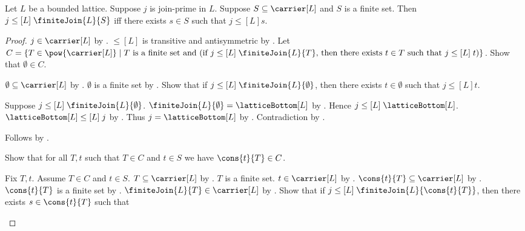\begin{theorem}\label{join_prime_below_finite_join_iff}
    Let $L$ be a bounded lattice.
    Suppose $j$ is join-prime in $L$.
    Suppose $S\subseteq\carrier[L]$ and $S$ is a finite set.
    Then $j\mathrel{\leq[L]}\finiteJoin{L}{S}$ iff
        there exists $s\in S$ such that $j\mathrel{\leq[L]}s$.
\end{theorem}
\begin{proof}
    $j\in\carrier[L]$ by .
    $\leq[L]$ is transitive and antisymmetric by
        .
    Let $C=\{T\in\pow{\carrier[L]}\mid
        \text{$T$ is a finite set and (if
            $j\mathrel{\leq[L]}\finiteJoin{L}{T}$, then
            there exists $t\in T$ such that $j\mathrel{\leq[L]}t$)}\}$.
    Show that $\emptyset\in C$.
    \begin{subproof}
        $\emptyset\subseteq\carrier[L]$ by .
        $\emptyset$ is a finite set by .
        Show that if $j\mathrel{\leq[L]}\finiteJoin{L}{\emptyset}$, then
            there exists $t\in\emptyset$ such that
                $j\mathrel{\leq[L]}t$.
        \begin{subproof}
            Suppose $j\mathrel{\leq[L]}\finiteJoin{L}{\emptyset}$.
            $\finiteJoin{L}{\emptyset}=\latticeBottom[L]$ by
                .
            Hence $j\mathrel{\leq[L]}\latticeBottom[L]$.
            $\latticeBottom[L]\mathrel{\leq[L]}j$ by
                .
            Thus $j=\latticeBottom[L]$ by .
            Contradiction by .
        \end{subproof}
        Follows by .
    \end{subproof}
    Show that for all $T,t$ such that $T\in C$ and $t\in S$ we have
        $\cons{t}{T}\in C$.
    \begin{subproof}
        Fix $T,t$.
        Assume $T\in C$ and $t\in S$.
        $T\subseteq\carrier[L]$ by .
        $T$ is a finite set.
        $t\in\carrier[L]$ by .
        $\cons{t}{T}\subseteq\carrier[L]$ by
            .
        $\cons{t}{T}$ is a finite set by .
        $\finiteJoin{L}{T}\in\carrier[L]$ by .
        Show that if
            $j\mathrel{\leq[L]}\finiteJoin{L}{\cons{t}{T}}$, then
            there exists $s\in\cons{t}{T}$ such that

\end{subproof}
\end{proof}
